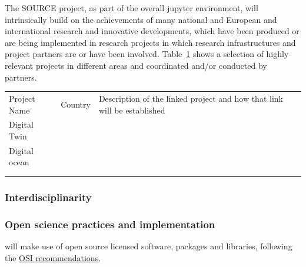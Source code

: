 The SOURCE project, as part of the overall jupyter environment, will intrinsically build on the achievements of many national and European and international research and innovative developments, which have been produced or are being implemented in research projects in which research infrastructures and project partners are or have been involved.
Table~\ref{tab:national-research} shows a selection of highly relevant projects in different areas and coordinated and/or conducted by \TheProject partners.



\begin{table}[]
\label{tab:national-research}
\begin{tabular}{lll}
\rowcolor[HTML]{00D2CB}
 
Project Name  & Country & Description of the linked project and how that link will be established \\
Digital Twin  &         &                                                                         \\
Digital ocean &         &                                                                         \\
              &         &                                                                         \\
              &         &                                                                        

\end{tabular}
\end{table} 




\subsubsection{Interdisciplinarity}

\TOWRITE{}{}

\subsubsection{Open science practices and implementation}

\TheProject will make use of open source licensed software, packages and libraries, following the \href{https://opensource.org/licenses}{OSI recommendations}.

